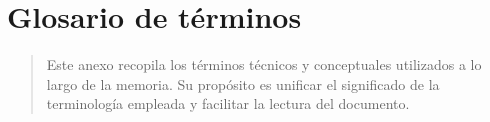 \chapter{Glosario de términos}

\begin{abstract}
Este anexo recopila los términos técnicos y conceptuales utilizados a lo largo de la
memoria. Su propósito es unificar el significado de la terminología empleada y facilitar la
lectura del documento.
\end{abstract}

\printglossary[title={Glosario de términos},toctitle={Glosario de términos}]
